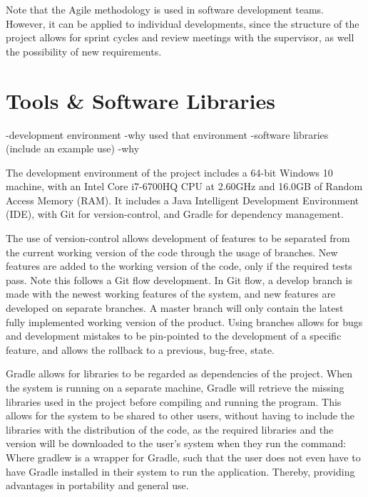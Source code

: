 \par Note that the Agile methodology is used in software development teams. However,	 it can be applied to individual developments, since the structure of the project allows for sprint cycles and review meetings with the supervisor, as well the possibility of new requirements.

\section{Tools \& Software Libraries}
-development environment
-why used that environment
-software libraries (include an example use)
-why
\par The development environment of the project includes a 64-bit Windows 10 machine, with an Intel Core i7-6700HQ CPU at 2.60GHz and 16.0GB of Random Access Memory (RAM). It includes a Java Intelligent Development Environment (IDE), with Git for version-control, and Gradle for dependency management. 

\par The use of version-control allows development of features to be separated from the current working version of the code through the usage of branches. New features are added to the working version of the code, only if the required tests pass. Note this follows a Git flow development. In Git flow, a develop branch is made with the newest working features of the system, and new features are developed on separate branches. A master branch will only contain the latest fully implemented working version of the product. Using branches allows for bugs and development mistakes to be pin-pointed to the development of a specific feature, and allows the rollback to a previous, bug-free, state.

\par Gradle allows for libraries to be regarded as dependencies of the project. When the system is running on a separate machine, Gradle will retrieve the missing libraries used in the project before compiling and running the program. This allows for the system to be shared to other users, without having to include the libraries with the distribution of the code, as the required libraries and the version will be downloaded to the user's system when they run the command:
Where gradlew is a wrapper for Gradle, such that the user does not even have to have Gradle installed in their system to run the application. Thereby, providing advantages in portability and general use.

